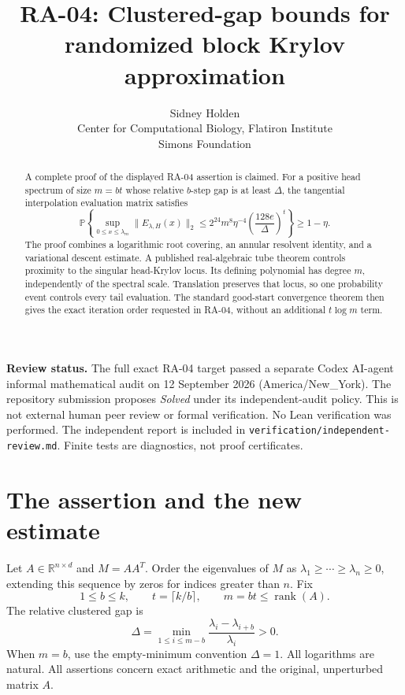 \documentclass[11pt]{article}
\title{RA-04: Clustered-gap bounds for randomized block Krylov approximation}
\author{Sidney Holden\\{\small Center for Computational Biology, Flatiron Institute}\\{\small Simons Foundation}}
\date{}
\numberwithin{equation}{section}
\theoremstyle{definition}
\newcommand{\R}{\mathbb R}
\newcommand{\Prob}{\mathbb P}
\newcommand{\rank}{\operatorname{rank}}
\newcommand{\nn}[1]{\lVert #1\rVert}
\begin{document}
\maketitle
\vspace{-1em}
\begin{abstract}
A complete proof of the displayed RA-04 assertion is claimed. For a positive head spectrum of size $m=bt$ whose relative $b$-step gap is at least $\Delta$, the tangential interpolation evaluation matrix satisfies
\[
\Prob\!\left\{\sup_{0\le x\le\lambda_m}\nn{E_{\lambda,H}(x)}_2
\le 2^{24}m^8\eta^{-4}\left(\frac{128e}{\Delta}\right)^t\right\}\ge1-\eta.
\]
The proof combines a logarithmic root covering, an annular resolvent identity, and a variational descent estimate. A published real-algebraic tube theorem controls proximity to the singular head-Krylov locus. Its defining polynomial has degree $m$, independently of the spectral scale. Translation preserves that locus, so one probability event controls every tail evaluation. The standard good-start convergence theorem then gives the exact iteration order requested in RA-04, without an additional $t\log m$ term.
\end{abstract}

\textbf{Review status.} The full exact RA-04 target passed a separate Codex AI-agent informal mathematical audit on 12 September 2026 (America/New\_York). The repository submission proposes \emph{Solved} under its independent-audit policy. This is not external human peer review or formal verification. No Lean verification was performed. The independent report is included in \texttt{verification/independent-review.md}. Finite tests are diagnostics, not proof certificates.

\section{The assertion and the new estimate}\label{sec:statement}
Let $A\in\R^{n\times d}$ and $M=AA^T$. Order the eigenvalues of $M$ as
$\lambda_1\ge\cdots\ge\lambda_n\ge0$, extending this sequence by zeros for indices greater than $n$. Fix
\[
1\le b\le k,\qquad t=\lceil k/b\rceil,\qquad m=bt\le\rank(A).
\]
The relative clustered gap is
\begin{equation}\label{eq:gap}
\Delta=\min_{1\le i\le m-b}\frac{\lambda_i-\lambda_{i+b}}{\lambda_i}>0.
\end{equation}
When $m=b$, use the empty-minimum convention $\Delta=1$. All logarithms are natural. All assertions concern exact arithmetic and the original, unperturbed matrix $A$.
\end{document}
